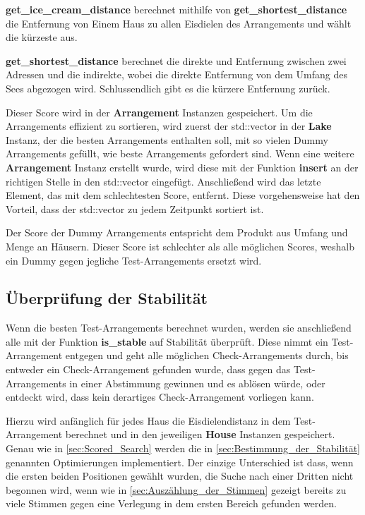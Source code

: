 \documentclass[a4paper,10pt,ngerman]{scrartcl}
\begin{document}
\medskip
\begin{addmargin}[3em]{4em}
    \textbf{get\_ice\_cream\_distance} berechnet mithilfe von \textbf{get\_shortest\_distance} die Entfernung von Einem Haus zu allen Eisdielen des Arrangements und wählt die kürzeste aus.
\end{addmargin}

\medskip
\begin{addmargin}[3em]{4em}
    \textbf{get\_shortest\_distance} berechnet die direkte und Entfernung zwischen zwei Adressen und die indirekte, wobei die direkte Entfernung von dem Umfang des Sees abgezogen wird.
    Schlussendlich gibt es die kürzere Entfernung zurück.
\end{addmargin}

\medskip
Dieser Score wird in der \textbf{Arrangement} Instanzen gespeichert.
Um die Arrangements effizient zu sortieren, wird zuerst der std::vector in der \textbf{Lake} Instanz, der die besten Arrangements enthalten soll, mit so vielen Dummy Arrangements gefüllt, wie beste Arrangements gefordert sind.
Wenn eine weitere \textbf{Arrangement} Instanz erstellt wurde, wird diese mit der Funktion \textbf{insert} an der richtigen Stelle in den std::vector eingefügt.
Anschließend wird das letzte Element, das mit dem schlechtesten Score, entfernt.
Diese vorgehensweise hat den Vorteil, dass der std::vector zu jedem Zeitpunkt sortiert ist.

Der Score der Dummy Arrangements entspricht dem Produkt aus Umfang und Menge an Häusern.
Dieser Score ist schlechter als alle möglichen Scores, weshalb ein Dummy gegen jegliche Test-Arrangements ersetzt wird.

\subsection{Überprüfung der Stabilität}
\label{sec:Überprüfung_der_Stabilität}
Wenn die besten Test-Arrangements berechnet wurden, werden sie anschließend alle mit der Funktion \textbf{is\_stable} auf Stabilität überprüft.
Diese nimmt ein Test-Arrangement entgegen und geht alle möglichen Check-Arrangements durch, bis entweder ein Check-Arrangement gefunden wurde, dass gegen das Test-Arrangements in einer Abstimmung gewinnen und es ablösen würde, oder entdeckt wird, dass kein derartiges Check-Arrangement vorliegen kann.

\medskip
Hierzu wird anfänglich für jedes Haus die Eisdielendistanz in dem Test-Arrangement berechnet und in den jeweiligen \textbf{House} Instanzen gespeichert.
Genau wie in \autoref{sec:Scored_Search} werden die in \autoref{sec:Bestimmung_der_Stabilität} genannten Optimierungen implementiert.
Der einzige Unterschied ist dass, wenn die ersten beiden Positionen gewählt wurden, die Suche nach einer Dritten nicht begonnen wird, wenn wie in \autoref{sec:Auszählung_der_Stimmen} gezeigt bereits zu viele Stimmen gegen eine Verlegung in dem ersten Bereich gefunden werden.
\end{document}
